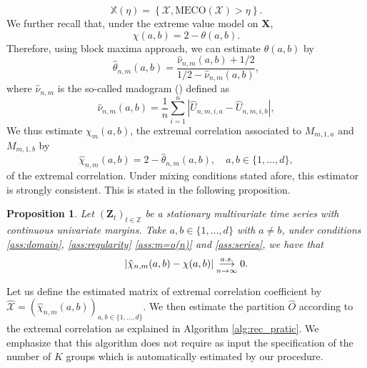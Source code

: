 \documentclass[11pt]{article}
\newcommand{\MECO}{\mathrm{MECO}}
\newtheorem{proposition}{Proposition}
\theoremstyle{definition}
\begin{document}
	\begin{equation*}
		\mathbb{X}(\eta) = \left\{ \mathcal{X}, \MECO(\mathcal{X}) > \eta \right\}.
	\end{equation*}
	We further recall that, under the extreme value model on $\textbf{X}$,
	\begin{equation}
		\chi(a,b) = 2 - \theta(a,b).
	\end{equation}
	Therefore, using block maxima approach, we can estimate $\theta(a,b)$ by 
	\begin{equation*}
		\hat{\theta}_{n,m}(a,b) = \frac{\hat{\nu}_{n,m}(a,b) + 1/2}{1/2 - \hat{\nu}_{n,m}(a,b)},
	\end{equation*}
	where $\hat{\nu}_{n,m}$ is the so-called madogram (\cite{cooley2006variograms}) defined as
	\begin{equation*}
		\hat{\nu}_{n,m}(a,b) = \frac{1}{n} \sum_{i=1}^n \left| \hat{U}_{n,m,i,a} - \hat{U}_{n,m,i,b}\right|,
	\end{equation*}
	We thus estimate $\chi_m(a,b)$, the extremal correlation associated to $M_{m,1,a}$ and $M_{m,1,b}$ by
	\begin{equation*}
		\hat{\chi}_{n,m}(a,b) = 2 - \hat{\theta}_{n,m}(a,b), \quad  a,b \in \{1,\dots, d\},
	\end{equation*}
	of the extremal correlation. Under mixing conditions stated afore, this estimator is strongly consistent. This is stated in the following proposition.
	\begin{proposition}
		\label{prop:strong_consistency}
		Let $(\textbf{Z}_t)_{t \in \mathbb{Z}}$ be a stationary multivariate time series with continuous univariate margins. Take $a,b \in \{1,\dots,d\}$ with $a \neq b$, under conditions \ref{ass:domain}, \ref{ass:regularity} \ref{ass:m=o(n)} and \ref{ass:series}, we have that
		\begin{equation*}
		\left| \hat{\chi}_{n,m}(a,b) - \chi(a,b) \right| \overunderset{a.s.}{n \rightarrow \infty}{\longrightarrow} 0.
	\end{equation*}
	\end{proposition}
	
	Let us define the estimated matrix of extremal correlation coefficient by $\hat{\mathcal{X}} = (\hat{\chi}_{n,m}(a,b))_{a,b \in \{1,\dots,d\}}$. We then estimate the partition $\hat{O}$ according to the extremal correlation as explained in Algorithm \ref{alg:rec_pratic}. We emphasize that this algorithm does not require as input the specification of the number of $K$ groups which is automatically estimated by our procedure.
	
\end{document}
